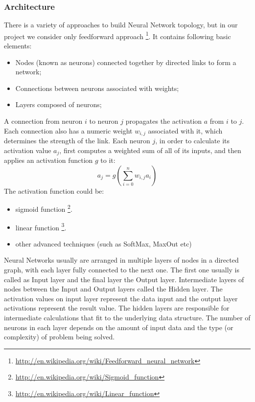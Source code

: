 \documentclass[a4paper,oneside,dvipsnames]{article}
\begin{document}
\subsubsection[Architecture]{Architecture}
There is a variety of approaches to build Neural Network topology, but in our project we consider only feedforward approach
\footnote{\url{http://en.wikipedia.org/wiki/Feedforward\_neural\_network}}.
It contains following basic elements:
\begin{itemize}
    \item Nodes (known as neurons) connected together by directed links to form a network;
    \item Connections between neurons associated with weights;
    \item Layers composed of neurons;
\end{itemize}
A connection from neuron $i$ to neuron $j$ propagates the activation $a$ from $i$ to $j$. Each connection also has a numeric weight $w_{i,j}$ associated with it, which determines the strength of the link. Each neuron $j$, in order to calculate its activation value $a_j$, first computes a weighted sum of all of its inputs, and then applies an activation function $g$ to it:
\begin{equation} \label{eq:activation}
    a_j = g(\sum_{i=0}^{n} w_{i,j} a_i)
\end{equation}
The activation function could be:
\begin{itemize}
    \item sigmoid function
    \footnote{\url{http://en.wikipedia.org/wiki/Sigmoid\_function}}.
    \item linear function
    \footnote{\url{http://en.wikipedia.org/wiki/Linear\_function}}.
    \item other advanced techniques (such as SoftMax, MaxOut etc)
\end{itemize}
Neural Networks usually are arranged in multiple layers of nodes in a directed graph, with each layer fully connected to the next one. The first one usually is called as Input layer and the final layer the Output layer. Intermediate layers of nodes between the Input and Output layers called the Hidden layer. The activation values on input layer represent the data input and the output layer activations represent the result value. The hidden layers are responsible for intermediate calculations that fit to the underlying data structure. The number of neurons in each layer depends on the amount of input data and the type (or complexity) of problem being solved.
\end{document}
